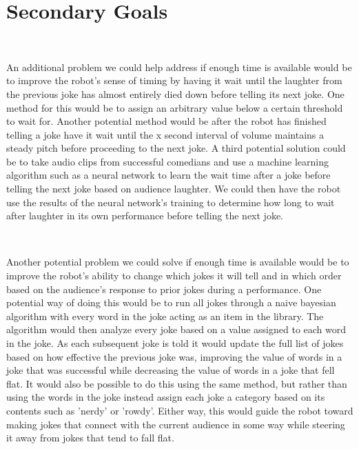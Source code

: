 \documentclass[onecolumn, draftclsnofoot,10pt, compsoc]{IEEEtran}
\begin{document}
\section{Secondary Goals}
\ \par
\noindent An additional problem we could help address if enough time is available would be to improve the robot's sense of timing by having it wait until the laughter from the previous joke has almost entirely died down before telling its next joke. One method for this would be to assign an arbitrary value below a certain threshold to wait for. Another potential method would be after the robot has finished telling a joke have it wait until the x second interval of volume maintains a steady pitch before proceeding to the next joke. A third potential solution could be to take audio clips from successful comedians and use a machine learning algorithm such as a neural network to learn the wait time after a joke before telling the next joke based on audience laughter. We could then have the robot use the results of the neural network's training to determine how long to wait after laughter in its own performance before telling the next joke.\par
\ \par
\noindent Another potential problem we could solve if enough time is available would be to improve the robot's ability to change which jokes it will tell and in which order based on the audience's response to prior jokes during a performance. One potential way of doing this would be to run all jokes through a naive bayesian algorithm with every word in the joke acting as an item in the library. The algorithm would then analyze every joke based on a value assigned to each word in the joke. As each subsequent joke is told it would update the full list of jokes based on how effective the previous joke was, improving the value of words in a joke that was successful while decreasing the value of words in a joke that fell flat. It would also be possible to do this using the same method, but rather than using the words in the joke instead assign each joke a category based on its contents such as 'nerdy' or 'rowdy'. Either way, this would guide the robot toward making jokes that connect with the current audience in some way while steering it away from jokes that tend to fall flat.
\end{document}
